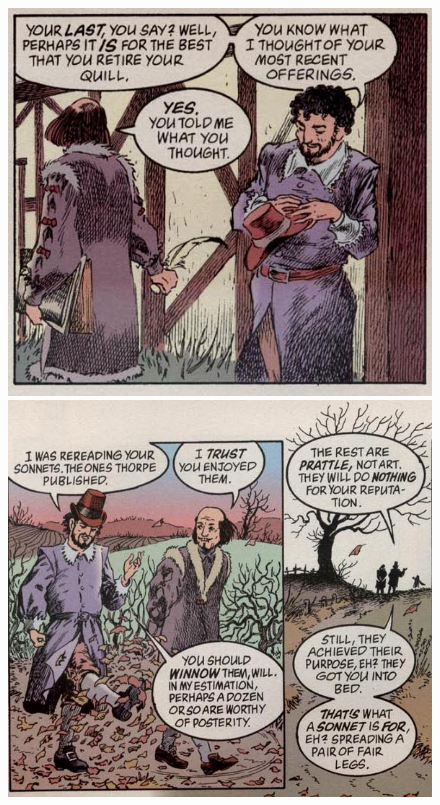 \documentclass{article}
\begin{document}
\begin{figure}[htp]
  \begin{center}
    \centering
    \includegraphics[scale=0.4]{../Presentation/ben.jpg}
    \includegraphics[scale=0.4]{../Presentation/ben2.jpg}
  \end{center}
\end{figure}
\end{document}
